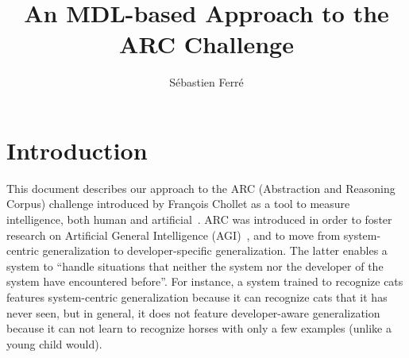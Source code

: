 \documentclass[a4paper]{llncs}
\newcommand{\HIDE}[1]{}
\begin{document}
\title{An MDL-based Approach to the ARC Challenge}

\author{Sébastien Ferré}


\maketitle

\begin{abstract}
\end{abstract}

\HIDE{
Measure of Intelligence
Artificial Intelligence
Explainable AI
Program Synthesis
Structured Prediction
Minimum Description Length
2D Parsing
}

\sloppy

\section{Introduction}
\label{intro}

This document describes our approach to the ARC (Abstraction and
Reasoning Corpus) challenge introduced by François Chollet as a tool
to measure intelligence, both human and artificial~\cite{Chollet2019}.
ARC was introduced in order to foster research on Artificial General
Intelligence (AGI)~\cite{Goertzel2014agi}, and to move from
system-centric generalization to developer-specific
generalization. The latter enables a system to ``handle situations
that neither the system nor the developer of the system have
encountered before''. For instance, a system trained to recognize cats
features system-centric generalization because it can recognize cats
that it has never seen, but in general, it does not feature
developer-aware generalization because it can not learn to recognize
horses with only a few examples (unlike a young child would).
\end{document}
